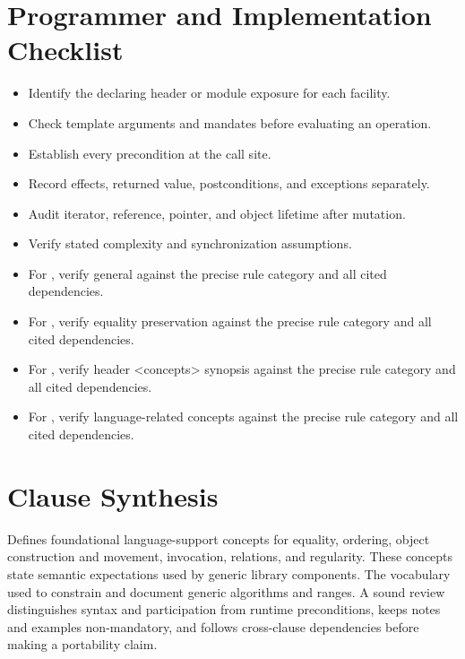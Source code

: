 \documentclass[11pt,letterpaper]{article}
\begin{document}
\section{Programmer and Implementation Checklist}
\begin{CornellReferenceChecklistBox}\begin{itemize}[label=$\square$]
\item Identify the declaring header or module exposure for each facility.
\item Check template arguments and mandates before evaluating an operation.
\item Establish every precondition at the call site.
\item Record effects, returned value, postconditions, and exceptions separately.
\item Audit iterator, reference, pointer, and object lifetime after mutation.
\item Verify stated complexity and synchronization assumptions.
\item For , verify general against the precise rule category and all cited dependencies.
\item For , verify equality preservation against the precise rule category and all cited dependencies.
\item For , verify header <concepts> synopsis against the precise rule category and all cited dependencies.
\item For , verify language-related concepts against the precise rule category and all cited dependencies.
\end{itemize}\end{CornellReferenceChecklistBox}
\section{Clause Synthesis}
\begin{CornellReferenceOrientationBox}Defines foundational language-support concepts for equality, ordering, object construction and movement, invocation, relations, and regularity. These concepts state semantic expectations used by generic library components. The vocabulary used to constrain and document generic algorithms and ranges. A sound review distinguishes syntax and participation from runtime preconditions, keeps notes and examples non-mandatory, and follows cross-clause dependencies before making a portability claim.\end{CornellReferenceOrientationBox}
\end{document}

